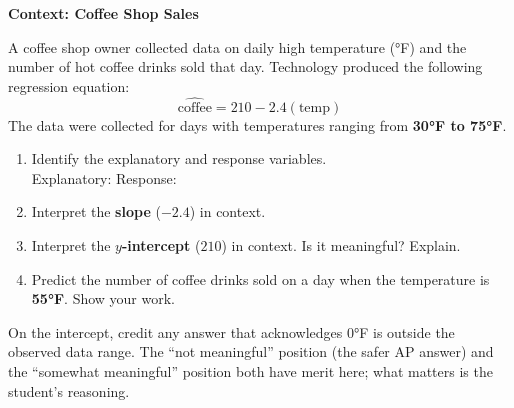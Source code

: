 \documentclass[10pt]{article}
\begin{document}
\begin{tcolorbox}[colback=white, colframe=black!40, boxrule=0.8pt, arc=2mm,
    left=4mm, right=4mm, top=3mm, bottom=3mm,
    title={\textbf{Tier R --- Remediate}}, fonttitle=\bfseries, halign title=center]
\small

\textbf{Context: Coffee Shop Sales}

A coffee shop owner collected data on daily high temperature (°F) and the number of hot
coffee drinks sold that day. Technology produced the following regression equation:
\[
  \widehat{\text{coffee}} = 210 - 2.4(\text{temp})
\]
The data were collected for days with temperatures ranging from \textbf{30°F to 75°F}.

\vspace{10pt}

\begin{enumerate}[leftmargin=1.6em, itemsep=0.2in]

  \item Identify the explanatory and response variables.\\[6pt]
        Explanatory:  \quad Response: 

  \item Interpret the \textbf{slope} ($-2.4$) in context.\\[8pt]

  \item Interpret the \textbf{$y$-intercept} ($210$) in context.
        Is it meaningful? Explain.\\[8pt]

  \item Predict the number of coffee drinks sold on a day when the temperature is \textbf{55°F}.
        Show your work.\\[8pt]

\end{enumerate}

\begin{teachernote}
On the intercept, credit any answer that acknowledges 0°F is outside the observed data range.
The ``not meaningful'' position (the safer AP answer) and the ``somewhat meaningful'' position
both have merit here; what matters is the student's reasoning.
\end{teachernote}
\end{tcolorbox}
\end{document}
